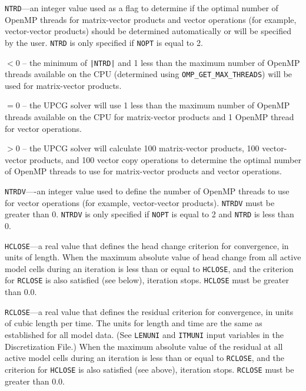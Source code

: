 \documentclass[12pt]{article} %
\begin{document}
\begin{description}
\item \texttt{NTRD}---an integer value used as a flag to determine if the optimal number of OpenMP threads for matrix-vector products and vector operations (for example, vector-vector products) should be determined automatically or will be specified by the user. \texttt{NTRD} is only specified if \texttt{NOPT} is equal to 2.
\begin{description}
\item $<$0 -- the minimum of \texttt{|NTRD|} and 1 less than the maximum number of OpenMP threads available on the CPU (determined using \texttt{OMP\_GET\_MAX\_THREADS}) will be used for matrix-vector products.
\item $=$0 -- the UPCG solver will use 1 less than the maximum number of OpenMP threads available on the CPU for matrix-vector products and 1 OpenMP thread for vector operations. 
\item $>$0 -- the UPCG solver will calculate 100 matrix-vector products, 100 vector-vector products, and 100 vector copy operations to determine the optimal number of OpenMP threads to use for matrix-vector products and vector operations.
\end{description}
\item \texttt{NTRDV}----an integer value used to define the number of OpenMP threads to use for vector operations (for example, vector-vector products). \texttt{NTRDV} must be greater than 0. \texttt{NTRDV} is only specified if \texttt{NOPT} is equal to 2 and \texttt{NTRD} is less than 0.


\item \texttt{HCLOSE}---a real value that defines the head change criterion for convergence, in units of length. When the maximum absolute value of head change from all active model cells during an iteration is less than or equal to \texttt{HCLOSE}, and the criterion for \texttt{RCLOSE} is also satisfied (see below), iteration stops. \texttt{HCLOSE} must be greater than 0.0.
\item \texttt{RCLOSE}---a real value that defines the residual criterion for convergence, in units of cubic length per time. The units for length and time are the same as established for all model data.  (See \texttt{LENUNI} and \texttt{ITMUNI} input variables in the Discretization File.)  When the maximum absolute value of the residual at all active model cells during an iteration is less than or equal to \texttt{RCLOSE}, and the criterion for \texttt{HCLOSE} is also satisfied (see above), iteration stops. \texttt{RCLOSE} must be greater than 0.0.

\end{description}
\end{document}

